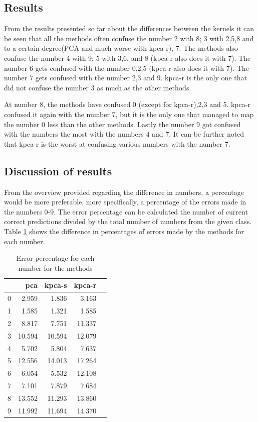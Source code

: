 \subsection{Results}
From the results presented so far about the differences between the kernels it can be seen that all the methods often confuse the number 2 with 8; 3 with 2,5,8 and to a certain degree(PCA and much worse with \gls{kpca-r}), 7. The methods also confuse the number 4 with 9; 5 with 3,6, and 8 (\gls{kpca-r} also does it with 7). The number 6 gets confused with the number 0,2,5 (\gls{kpca-r} also does it with 7).
The number 7 gets confused with the number 2,3 and 9. \gls{kpca-r} is the only one that did not confuse the number 3 as much as the other methods.

At number 8, the methods have confused 0 (except for \gls{kpca-r}),2,3 and 5. \gls{kpca-r} confused it again with the number 7, but it is the only one that managed to map the number 0 less than the other methods. Lastly the number 9 got confused with the numbers the most with the numbers 4 and 7. It can be further noted that \gls{kpca-r} is the worst at confusing various numbers with the number 7.

\subsection{Discussion of results}
From the overview provided regarding the difference in numbers, a percentage would be more preferable, more specifically, a percentage of the errors made in the numbers 0-9. The error percentage can be calculated the number of current correct predictions divided by the total number of numbers from the given class. Table \ref{tab:error-percentage-pca-kpca-s-kpca-r} shows the difference in percentages of errors made by the methods for each number.

\begin{table}[htb!]
    \centering
    \begin{tabular}{lrrrr}
        \toprule
          & pca    & kpca-s & kpca-r \\
        \midrule
        0 & 2.959  & 1.836  & 3.163  \\
        1 & 1.585  & 1.321  & 1.585  \\
        2 & 8.817  & 7.751  & 11.337 \\
        3 & 10.594 & 10.594 & 12.079 \\
        4 & 5.702  & 5.804  & 7.637  \\
        5 & 12.556 & 14.013 & 17.264 \\
        6 & 6.054  & 5.532  & 12.108 \\
        7 & 7.101  & 7.879  & 7.684  \\
        8 & 13.552 & 11.293 & 13.860 \\
        9 & 11.992 & 11.694 & 14.370 \\
        \bottomrule
    \end{tabular}
    \caption{Error percentage for each number for the methods}
    \label{tab:error-percentage-pca-kpca-s-kpca-r}
\end{table}


